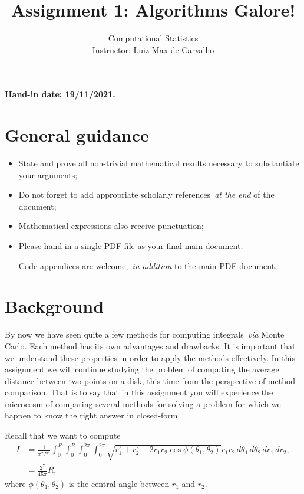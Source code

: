 \documentclass[a4paper,10pt, notitlepage]{report}
\title{Assignment 1: Algorithms Galore!}
\author{Computational Statistics \\ Instructor: Luiz Max de Carvalho}
\begin{document}
\maketitle

\textbf{Hand-in date: 19/11/2021.}

\section*{General guidance}
\begin{itemize}
 \item State and prove all non-trivial mathematical results necessary to substantiate your arguments;
 \item Do not forget to add appropriate scholarly references~\textit{at the end} of the document;
 \item Mathematical expressions also receive punctuation;
 \item Please hand in a single PDF file as your final main document.
 
 Code appendices are welcome,~\textit{in addition} to the main PDF document.
 \end{itemize}

\newpage

\section*{Background}

By now we have seen quite a few methods for computing integrals~\textit{via} Monte Carlo.
Each method has its own advantages and drawbacks.
It is important that we understand these properties in order to apply the methods effectively. 
In this assignment we will continue studying the problem of computing the average distance between two points on a disk, this time from the perspective of method comparison.
That is to say that in this assignment you will experience the microcosm of comparing several methods for solving a problem for which we happen to know the right answer in closed-form.

Recall that we want to compute 
 \begin{align*}
  I &= \frac{1}{\pi^2 R^4}\int_{0}^{R}\int_{0}^{R}\int_{0}^{2\pi}\int_{0}^{2\pi}\sqrt{r_1^2 + r_2^2 - 2r_1r_2\cos\phi(\theta_1, \theta_2)}r_1r_2\,d\theta_1\,d\theta_2\,dr_1\,dr_2,\\
  &= \frac{2^7}{45\pi}R,
 \end{align*}
 where $\phi(\theta_1, \theta_2)$ is the central angle between $r_1$ and $r_2$.
 
\end{document}

